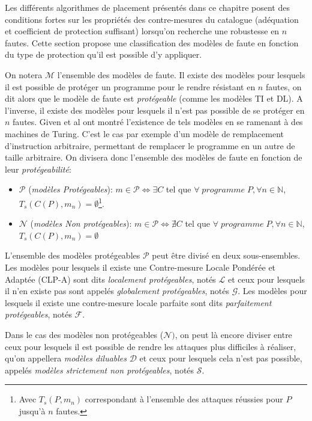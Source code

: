         Les différents algorithmes de placement présentés dans ce chapitre posent des conditions fortes sur les propriétés des contre-mesures du catalogue (adéquation et coefficient de protection suffisant) lorsqu'on recherche une robustesse en $n$ fautes.
        Cette section propose une classification des modèles de faute en fonction du type de protection qu'il est possible d'y appliquer.
        
        On notera $\mathcal{M}$ l'ensemble des modèles de faute.
        Il existe des modèles pour lesquels il est possible de protéger un programme pour le rendre résistant en $n$ fautes, on dit alors que le modèle de faute est \textit{protégeable} (comme les modèles \gls{TI} et \gls{DL}).
        A l'inverse, il existe des modèles pour lesquels il n'est pas possible de se protéger en $n$ fautes. Given et al \cite{Given/ICESS17} ont montré l'existence de tels modèles en se ramenant à des machines de Turing.
        C'est le cas par exemple d'un modèle de remplacement d'instruction arbitraire, permettant de remplacer le programme en un autre de taille arbitraire.
        On divisera donc l'ensemble des modèles de faute en fonction de leur \textit{protégeabilité}:
        
        \begin{itemize}
            \item $\mathcal{P}$ (\textit{modèles Protégeables}): $m \in \mathcal{P} \iff  \exists C $ tel que $\forall \; programme \; P, \forall n \in \mathbb{N}$, $T_s(C(P), m_n) = \emptyset$\footnote{Avec $T_s(P, m_n)$ correspondant à l'ensemble des attaques réussies pour $P$ jusqu'à $n$ fautes.}.
            \item $\mathcal{N}$ (\textit{modèles Non protégeables}): $m \in \mathcal{P} \iff  \nexists C $ tel que $\forall \; programme \; P, \forall n \in \mathbb{N}$, $T_s(C(P), m_n) = \emptyset$ 
        \end{itemize}
        
        L'ensemble des modèles protégeables $\mathcal{P}$ peut être divisé en deux sous-ensembles.
        Les modèles pour lesquels il existe une Contre-mesure Locale Pondérée et Adaptée (CLP-A) sont dits \textit{localement protégeables}, notés  $\mathcal{L}$ et ceux pour lesquels il n'en existe pas sont appelés \textit{globalement protégeables}, notés $\mathcal{G}$. 
        Les modèles pour lesquels il existe une contre-mesure locale parfaite sont dits \textit{parfaitement protégeables}, notés $\mathcal{F}$.
        
        Dans le cas des modèles non protégeables ($\mathcal{N})$, on peut là encore diviser entre ceux pour lesquels il est possible de rendre les attaques plus difficiles à réaliser, qu'on appellera \textit{modèles diluables} $\mathcal{D}$ et ceux pour lesquels cela n'est pas possible, appelés \textit{modèles strictement non protégeables}, notés $\mathcal{S}$.
        
